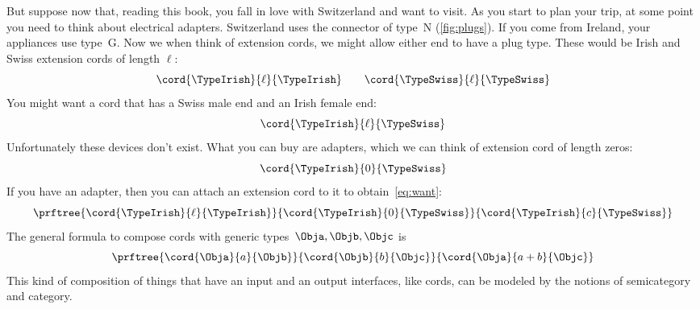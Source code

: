 But suppose now that, reading this book, you fall in love with Switzerland and want to visit.
As you start to plan your trip, at some point you need to think about electrical adapters.
Switzerland uses the connector of type~N (\cref{fig:plugs}).
If you come from Ireland, your appliances use type~G.
Now we when think of extension cords, we might allow either end to have a plug type.
%
These would be Irish and Swiss extension cords of length $\ell$:
%
\begin{equation}
    \label{eq:irish-swiss}
    \cord{\TypeIrish}{\ell}{\TypeIrish} \qquad \cord{\TypeSwiss}{\ell}{\TypeSwiss}
\end{equation}
%
You might want a cord that has a Swiss male end and an Irish female end:
%
\begin{equation}
    \label{eq:want}
    \cord{\TypeIrish}{\ell}{\TypeSwiss}
\end{equation}
%
Unfortunately these devices don't exist.
What you can buy are adapters, which we can think of extension cord of length zeros:
\begin{equation}
    \cord{\TypeIrish}{0}{\TypeSwiss}
\end{equation}
%
If you have an adapter, then you can attach an extension cord to it to obtain~\cref{eq:want}:
%
\begin{equation}
    \label{eq:irish-swiss-result}
    \prftree{\cord{\TypeIrish}{\ell}{\TypeIrish}}{\cord{\TypeIrish}{0}{\TypeSwiss}}{\cord{\TypeIrish}{c}{\TypeSwiss}}
\end{equation}
%
The general formula to compose cords with generic types~$\Obja, \Objb, \Objc$ is
%
\begin{equation}
    \label{eq:cords-generic}
    \prftree{\cord{\Obja}{a}{\Objb}}{\cord{\Objb}{b}{\Objc}}{\cord{\Obja}{a+b}{\Objc}}
\end{equation}
%
This kind of composition of things that have an input and an output interfaces, like cords, can be modeled by the notions of semicategory and category.

%

%
%
%

